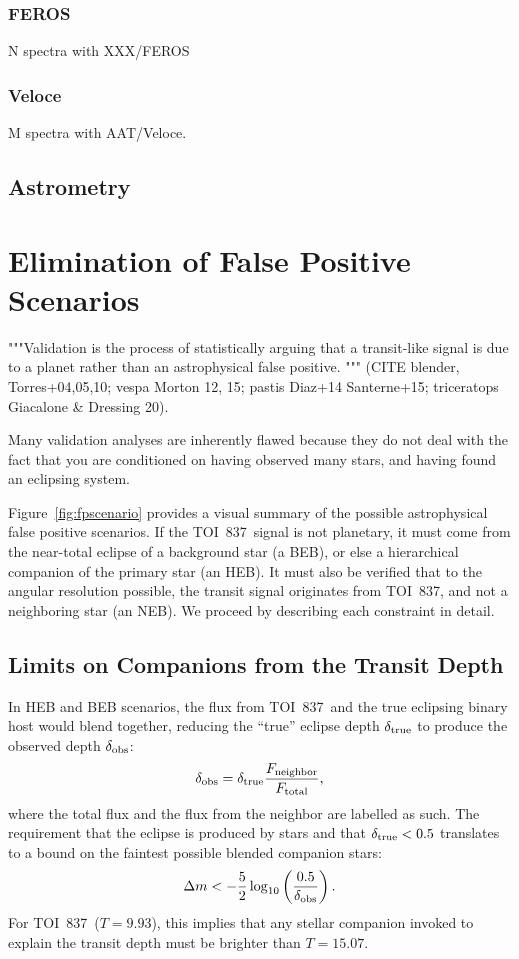 \documentclass[12pt,twocolumn,tighten]{aastex62}
\newcommand{\tn}{TOI~837} %
\begin{document}
\subsubsection{FEROS}
N spectra with XXX/FEROS

\subsubsection{Veloce}
M spectra with AAT/Veloce.

\subsection{Astrometry}


\section{Elimination of False Positive Scenarios}
\label{sec:validation}



"""Validation is the process of statistically arguing that a
transit-like signal is due to a planet rather than an astrophysical
false positive. """
(CITE blender, Torres+04,05,10; vespa Morton 12, 15; pastis Diaz+14
Santerne+15; triceratops Giacalone \& Dressing 20).

Many validation analyses are inherently flawed because they do
not deal with the fact that you are conditioned on having observed
many stars, and having found an eclipsing system.

Figure~\ref{fig:fpscenario} provides a visual summary of the possible
astrophysical false positive scenarios.  If the \tn\ signal is not
planetary, it must come from the near-total eclipse of a background
star (a BEB), or else a hierarchical companion of the primary star
(an HEB).  It must also be verified that to the angular resolution
possible, the transit signal originates from \tn, and not a
neighboring star (an NEB).
We proceed by describing each constraint in detail.

\subsection{Limits on Companions from the Transit Depth}

In HEB and BEB scenarios, the flux from \tn\ and the true eclipsing
binary host would blend together, reducing the ``true'' eclipse depth
$\delta_{\rm true}$ to produce the observed depth
$\delta_{\rm obs}$:
\begin{equation}
  \delta_{\rm obs}
  = 
  \delta_{\rm true} \frac{F_{\rm neighbor}}{F_{\rm total}},
\end{equation}
where the total flux and the flux from the neighbor are labelled as
such.  The requirement that the eclipse is produced by stars and that
$\delta_{\rm true} < 0.5$ translates to a bound on the faintest
possible blended companion stars:
\begin{equation}
    \Delta m < - \frac{5}{2} \log_{10} \left( \frac{0.5}{\delta_{\rm obs}} \right).
\end{equation}
For \tn\ ($T=9.93$), this implies that any stellar companion invoked
to explain the transit depth must be brighter than $T=15.07$.
\end{document}
